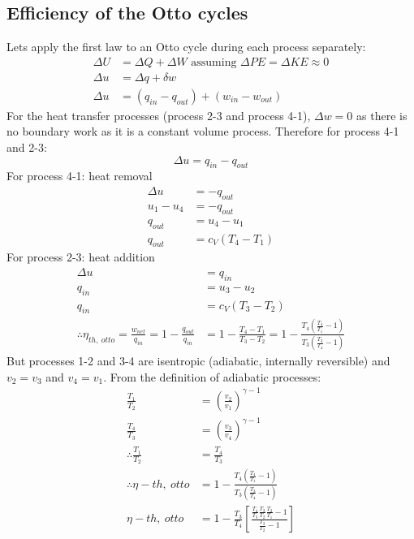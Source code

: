 \documentclass[class=report, crop=false, 12pt,a4paper]{standalone}
\begin{document}
\subsection{Efficiency of the Otto cycles}
Lets apply the first law to an Otto cycle during each process separately:
\begin{align}
  \Delta U &= \Delta Q + \Delta W \textrm{ assuming } \Delta PE = \Delta KE \approx 0\\
  \Delta u &= \Delta q + \delta w\\
  \Delta u &= (q_{in} - q_{out}) + (w_{in} - w_{out})
\end{align}
For the heat transfer processes (process 2-3 and process 4-1), $\Delta w = 0$ as there is no boundary work as it is a constant volume process. Therefore for process 4-1 and 2-3:
\begin{equation}
  \Delta u = q_{in} - q_{out}
\end{equation}
For process 4-1: heat removal
\begin{align}
  \Delta u &= -q_{out}\\
  u_1 - u_4 &= - q_{out}\\
  q_{out} &= u_4 - u_1\\
  q_{out} &= c_V(T_4 - T_1)
\end{align}
For process 2-3: heat addition
\begin{align}
  \Delta u &= q_{in}\\
  q_{in} &= u_3 - u_2\\
  q_{in} &= c_V(T_3 - T_2)\\
  \therefore \eta_{th , \ otto} = \frac{w_{net}}{q_{in}} = 1 - \frac{q_{out}}{q_{in}} &= 1 - \frac{T_4 - T_1}{T_3 - T_2} = 1 - \frac{T_4 \left( \frac{T_4}{T_1} -1 \right)}{T_3 \left( \frac{T_3}{T_4} - 1 \right)}
\end{align}
But processes 1-2 and 3-4 are isentropic (adiabatic, internally reversible) and $v_2 = v_3$ and $v_4 = v_1$. From the definition of adiabatic processes:
\begin{align}
  \frac{T_1}{T_2} &= \left( \frac{v_2}{v_1} \right)^{\gamma -1}\\
  \frac{T_4}{T_3} &= \left( \frac{v_3}{v_4} \right)^{\gamma -1}\\
  \therefore \frac{T_1}{T_2} &= \frac{T_4}{T_3}\\
  \therefore \eta-{th, \ otto} &= 1 - \frac{T_4 \left( \frac{T_4}{T_1} -1 \right)}{T_3 \left( \frac{T_3}{T_4} - 1 \right)}\\
  \eta-{th, \ otto} &= 1 - \frac{T_3}{T_4}\left[ \frac{\frac{T_4}{T_3} \frac{T_3}{T_2} \frac{T_2}{T_1} - 1}{\frac{T_3}{T_2} -1} \right]
\end{align}
\end{document}
